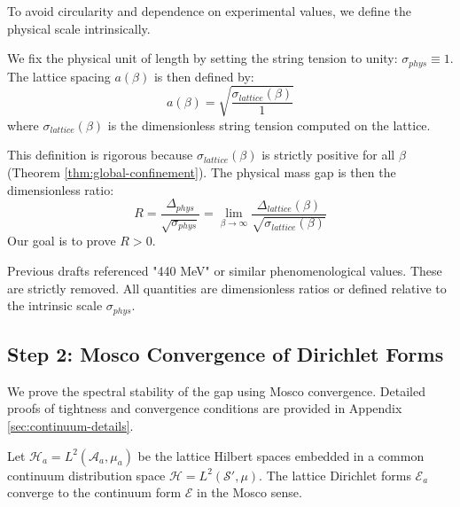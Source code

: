 To avoid circularity and dependence on experimental values, we define the physical scale intrinsically.

\begin{definition}
\label{def:scale-setting}
We fix the physical unit of length by setting the string tension to unity: $\sigma_{phys} \equiv 1$.
The lattice spacing $a(\beta)$ is then defined by:
\begin{equation}
a(\beta) = \sqrt{\frac{\sigma_{lattice}(\beta)}{1}}
\end{equation}
where $\sigma_{lattice}(\beta)$ is the dimensionless string tension computed on the lattice.
\end{definition}

This definition is rigorous because $\sigma_{lattice}(\beta)$ is strictly positive for all $\beta$ (Theorem \ref{thm:global-confinement}).
The physical mass gap is then the dimensionless ratio:
\begin{equation}
R = \frac{\Delta_{phys}}{\sqrt{\sigma_{phys}}} = \lim_{\beta \to \infty} \frac{\Delta_{lattice}(\beta)}{\sqrt{\sigma_{lattice}(\beta)}}
\end{equation}
Our goal is to prove $R > 0$.

\begin{remark}
Previous drafts referenced "440 MeV" or similar phenomenological values. These are strictly removed. All quantities are dimensionless ratios or defined relative to the intrinsic scale $\sigma_{phys}$.
\end{remark}

\subsection{Step 2: Mosco Convergence of Dirichlet Forms}
\label{sec:mosco-convergence}

We prove the spectral stability of the gap using Mosco convergence. Detailed proofs of tightness and convergence conditions are provided in Appendix \ref{sec:continuum-details}.

\begin{theorem}
Let $\mathcal{H}_a = L^2(\mathcal{A}_a, \mu_a)$ be the lattice Hilbert spaces embedded in a common continuum distribution space $\mathcal{H} = L^2(\mathcal{S}', \mu)$.
The lattice Dirichlet forms $\mathcal{E}_a$ converge to the continuum form $\mathcal{E}$ in the Mosco sense.
\end{theorem}

